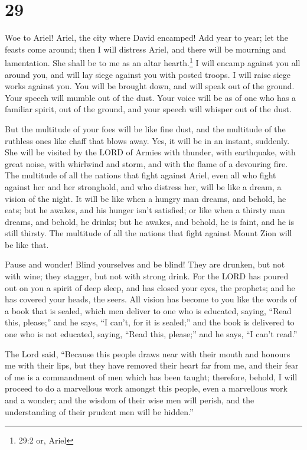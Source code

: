 \hypertarget{section-28}{%
\section{29}\label{section-28}}

 Woe to Ariel! Ariel, the city where David encamped! Add
year to year; let the feasts come around;  then I will
distress Ariel, and there will be mourning and lamentation. She shall be
to me as an altar hearth.\footnote{29:2 or, Ariel}  I will
encamp against you all around you, and will lay siege against you with
posted troops. I will raise siege works against you.  You
will be brought down, and will speak out of the ground. Your speech will
mumble out of the dust. Your voice will be as of one who has a familiar
spirit, out of the ground, and your speech will whisper out of the dust.

 But the multitude of your foes will be like fine dust, and
the multitude of the ruthless ones like chaff that blows away. Yes, it
will be in an instant, suddenly.  She will be visited by the
LORD of Armies with thunder, with earthquake, with great noise, with
whirlwind and storm, and with the flame of a devouring fire.
 The multitude of all the nations that fight against Ariel,
even all who fight against her and her stronghold, and who distress her,
will be like a dream, a vision of the night.  It will be
like when a hungry man dreams, and behold, he eats; but he awakes, and
his hunger isn't satisfied; or like when a thirsty man dreams, and
behold, he drinks; but he awakes, and behold, he is faint, and he is
still thirsty. The multitude of all the nations that fight against Mount
Zion will be like that.

 Pause and wonder! Blind yourselves and be blind! They are
drunken, but not with wine; they stagger, but not with strong drink.
 For the LORD has poured out on you a spirit of deep sleep,
and has closed your eyes, the prophets; and he has covered your heads,
the seers.  All vision has become to you like the words of
a book that is sealed, which men deliver to one who is educated, saying,
``Read this, please;'' and he says, ``I can't, for it is sealed;''
 and the book is delivered to one who is not educated,
saying, ``Read this, please;'' and he says, ``I can't read.''

 The Lord said, ``Because this people draws near with their
mouth and honours me with their lips, but they have removed their heart
far from me, and their fear of me is a commandment of men which has been
taught;  therefore, behold, I will proceed to do a
marvellous work amongst this people, even a marvellous work and a
wonder; and the wisdom of their wise men will perish, and the
understanding of their prudent men will be hidden.''

